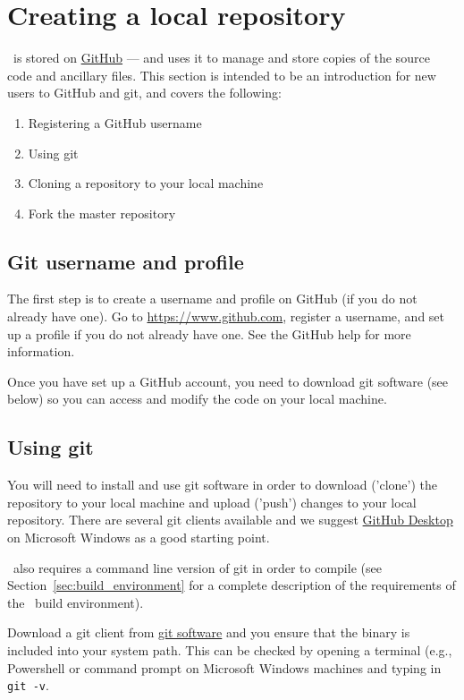 \section{Creating a local repository\label{sec:local_repo}}

\CNAME\ is stored on \href{http://www.github.com/Casal2/}{GitHub} --- and uses it to manage and store copies of the source code and ancillary files. This section is intended to be an introduction for new users to GitHub and git, and covers the following:

\begin{enumerate}
	\item Registering a GitHub username
	\item Using git
	\item Cloning a repository to your local machine
	\item Fork the master repository
\end{enumerate}

\subsection{Git username and profile}

The first step is to create a username and profile on GitHub (if you do not already have one). Go to \url{https://www.github.com}, register a username, and set up a profile if you do not already have one. See the GitHub help for more information. 

Once you have set up a GitHub account, you need to download git software (see below) so you can access and modify the code on your local machine.

\subsection{Using git}

You will need to install and use git software in order to download ('clone') the repository to your local machine and upload ('push') changes to your local repository. There are several git clients available and we suggest \href{https://desktop.github.com/}{GitHub Desktop} on Microsoft Windows as a good starting point. 

\CNAME\ also requires a command line version of git in order to compile (see Section~\ref{sec:build_environment} for a complete description of the requirements of the \CNAME\ build environment).  

Download a git client from \href{https://git-scm.com/downloads}{git software} and you ensure that the binary is included into your system path. This can be checked by opening a terminal (e.g., Powershell or command prompt on Microsoft Windows machines and typing in \texttt{git -v}. 

